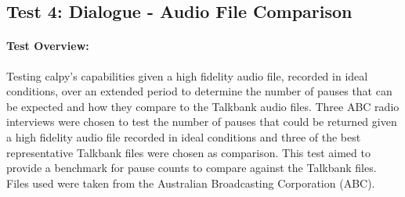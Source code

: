 \subsection{Test 4: Dialogue - Audio File Comparison}
	\paragraph{Test Overview:} Testing calpy's capabilities given a 
	high fidelity audio file, recorded in ideal conditions, over an extended 
	period to determine the number of pauses that can be expected and how they compare to the Talkbank audio files. 
	Three ABC radio interviews were chosen to test the number of pauses that could be returned 
	given a high fidelity audio file recorded in ideal conditions and three of the best representative Talkbank files were chosen as comparison.
	This test aimed to provide a benchmark for pause counts to compare against the Talkbank files. 
	Files used were taken from the Australian Broadcasting Corporation (ABC).

%






